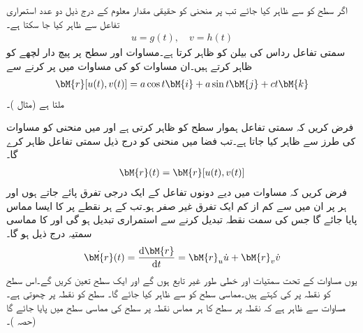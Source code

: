 اگر سطح  کو  سے ظاہر کیا جائے تب  پر منحنی کو حقیقی مقدار معلوم  کے درج ذیل دو عدد استمراری تفاعل سے ظاہر کیا جا سکتا ہے۔
\begin{align}\label{مساوات_خطی_تکمل_سطح_میں_منحنی_الف}
u=g(t),\quad v=h(t)
\end{align}
\quad سمتی تفاعل  رداس  کی بیلن  کو ظاہر کرتا ہے۔مساوات  اور  سطح  پر پیچ دار لچھے کو ظاہر کرتے ہیں۔ان مساوات کو  کی مساوات میں پر کرنے سے
\begin{align*}
\bM{r}[u(t),v(t)]=a\cos t\bM{i}+a\sin t\bM{j}+ct\bM{k}
\end{align*}
ملتا ہے (مثال )۔

فرض کریں کہ سمتی تفاعل  ہموار سطح  کو ظاہر کرتی ہے اور  میں منحنی  کو مساوات  کی طرز سے ظاہر کیا جاتا ہے۔تب فضا میں منحنی  کو درج ذیل سمتی تفاعل ظاہر کرے گا۔
\begin{align}\label{مساوات_خطی_تکمل_سطح_میں_منحنی_ب}
\bM{r}(t)=\bM{r}[u(t),v(t)]
\end{align}
فرض کریں کہ مساوات   میں دیے دونوں تفاعل کے ایک درجی تفرق پائے جاتے ہوں اور ہر  پر ان میں سے  کم از کم ایک تفرق غیر صفر ہو۔تب  کے ہر نقطے  پر  کا ایسا مماس پایا جائے گا جس کی سمت نقطہ تبدیل کرنے سے استمراری تبدیل ہو گی اور  کا مماسی سمتیہ درج ذیل ہو گا۔
\begin{align*}
\dot{\bM{r}}(t)=\frac{\dif \bM{r}}{\dif t}=\bM{r}_u\dot{u}+\bM{r}_v\dot{v}
\end{align*}
یوں مساوات  کے تحت سمتیات  اور
  خطی طور غیر تابع ہوں گے اور ایک سطح تعین کریں گے۔اس سطح کو  نقطہ  پر  کی  کہتے ہیں۔مماسی سطح کو  سے ظاہر کیا جائے گا۔ سطح  کو نقطہ  پر چھوتی ہے۔ مساوات  سے ظاہر ہے کہ  نقطہ  پر سطح  کا ہر مماس نقطہ  پر سطح کی مماسی سطح  میں پایا جائے گا (حصہ )۔

